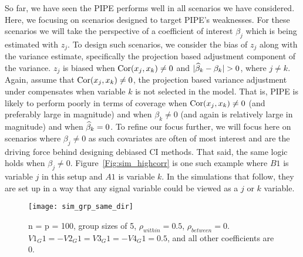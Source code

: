 So far, we have seen the PIPE performs well in all scenarios we have considered. Here, we focusing on scenarios designed to target PIPE's weaknesses. For these scenarios we will take the perspective of a coefficient of interest $\beta_j$ which is being estimated with $z_j$. To design such scenarios, we consider the bias of $z_j$ along with the variance estimate, specifically the projection based adjustment component of the variance. $z_j$ is biased when $\textrm{Cor}(x_j, x_k) \neq 0$ and $|\widehat{\beta}_k - \beta_k| > 0$, where $j \neq k$. Again, assume that $\textrm{Cor}(x_j, x_k) \neq 0$, the projection based variance adjustment under compensates when variable $k$ is not selected in the model. That is, PIPE is likely to perform poorly in terms of coverage when $\textrm{Cor}(x_j, x_k) \neq 0$ (and preferably large in magnitude) and when $\beta_k \neq 0$ (and again is relatively large in magnitude) and when $\widehat{\beta}_k = 0$. To refine our focus further, we will focus here on scenarios where $\beta_j \neq 0$ as such covariates are often of most interest and are the driving force behind designing debiased CI methods. That said, the same logic holds when $\beta_j \neq 0$. Figure~\ref{Fig:sim_highcorr} is one such example where $B1$ is variable $j$ in this setup and $A1$ is variable $k$. In the simulations that follow, they are set up in a way that any signal variable could be viewed as a $j$ or $k$ variable. 

\begin{figure}[hbtp]
    \begin{center}
    \texttt{[image: sim\_grp\_same\_dir]}
    \caption{\label{Fig:sim_grp_same_dir} n = p = 100, group sizes of 5, $\rho_{within} = 0.5$, $\rho_{between} = 0$. $V1_G1 = -V2_G1 = V3_G1 = -V4_G1 = 0.5$, and all other coefficients are 0.}
    \end{center}
\end{figure}

